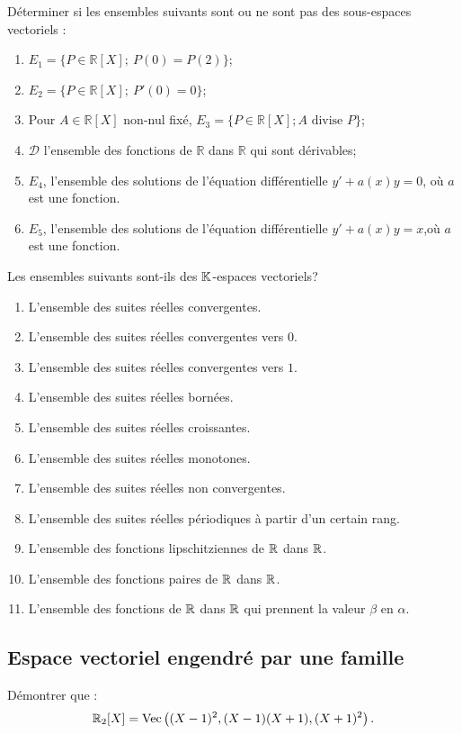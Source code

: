 \documentclass{book}
\begin{document}
\begin{Exercice}
Déterminer si les ensembles suivants sont ou ne sont pas des sous-espaces vectoriels :
\begin{enumerate}
\item $E_1=\{P\in\mathbb R[X];\ P(0)=P(2)\}$;
\item $E_2=\{P\in\mathbb R[X];\ P'(0)=0\}$;
\item Pour $A\in\mathbb R[X]$ non-nul fixé, $E_3=\{P\in\mathbb R[X]; A\text{ divise }P\}$;
\item $\mathcal D$ l'ensemble des fonctions de $\mathbb R$ dans $\mathbb R$ qui sont dérivables;
\item $E_4$, l'ensemble des solutions de l'équation différentielle $y'+a(x) y=0$, où $a$ est une fonction.
\item $E_5$, l'ensemble des solutions de l'équation différentielle $y'+a(x) y=x$,où $a$ est une fonction.
\end{enumerate}
\end{Exercice}

 \begin{Exercice}
Les ensembles suivants sont-ils des $\mathbb{K}  $-espaces vectoriels?
\begin{enumerate}
\item L'ensemble des suites réelles convergentes.
\item L'ensemble des suites réelles convergentes vers $0$.
\item L'ensemble des suites réelles convergentes vers $1$.
\item L'ensemble des suites réelles bornées.
\item L'ensemble des suites réelles croissantes.
\item L'ensemble des suites réelles monotones.
\item L'ensemble des suites réelles non convergentes.
\item L'ensemble des suites réelles périodiques à partir d'un certain rang.
\item L'ensemble des fonctions lipschitziennes de $\mathbb{R} $ dans $\mathbb{R} $.
\item L'ensemble des fonctions paires de $\mathbb{R} $ dans $\mathbb{R} $.
\item L'ensemble des fonctions de $\mathbb{R} $ dans $\mathbb{R} $ qui prennent la valeur $\beta$ en $\alpha$.
\end{enumerate}
\end{Exercice}

\subsection{Espace vectoriel engendré par une famille}
 \begin{Exercice}[Polynôme]
Démontrer que :
$$\mathbb{R}_2[X]=\text{Vec} \left( (X-1)^2,(X-1)(X+1),(X+1)^2\right).$$ 
\end{Exercice}
\end{document}
